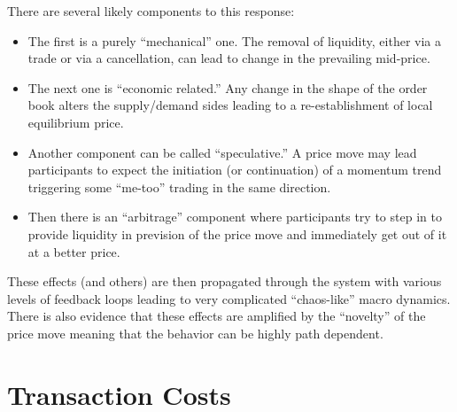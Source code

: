 There are several likely components to this response:
        \begin{itemize}
        \item The first is a purely ``mechanical'' one. The removal of liquidity, either via a trade or via a cancellation, can lead to change in the prevailing mid-price.
        \item The next one is ``economic related.'' Any change in the shape of the order book alters the supply/demand sides leading to a re-establishment of local equilibrium price. 
        \item Another component can be called ``speculative.'' A price move may lead participants to expect the initiation (or continuation) of a momentum trend triggering some ``me-too'' trading in the same direction.
        \item Then there is an ``arbitrage'' component where participants try to step in to provide liquidity in prevision of the price move and immediately get out of it at a better price.
        \end{itemize} 


These effects (and others) are then propagated through the system with various levels of feedback loops leading to very complicated ``chaos-like'' macro dynamics. There is also evidence that these effects are amplified by the ``novelty'' of the price move meaning that the behavior can be highly path dependent. 



\section{Transaction Costs}

